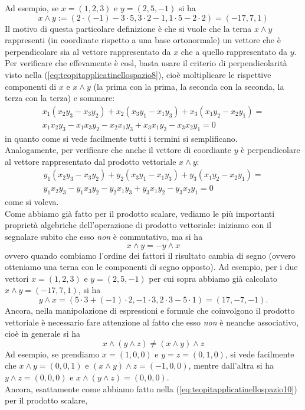 \documentclass{book}
\theoremstyle{definition}
\theoremstyle{plain}
\begin{document}
Ad esempio, se $x=(1,2,3)$ e $y=(2,5,-1)$ si ha
\begin{equation*}
  x\wedge y := (2\cdot (-1)-3\cdot 5, 3\cdot 2-1,1\cdot 5-2\cdot 2) = (-17,7,1)
\end{equation*}
Il motivo di questa particolare definizione è che si vuole che la terna $x \wedge y$ rappresenti (in coordinate rispetto a una base ortonormale) un vettore che è perpendicolare sia al vettore rappresentato da $x$ che a quello rappresentato da $y$.\\
Per verificare che effevamente è così, basta usare il criterio di perpendicolarità visto nella (\ref{eq:teopitapplicatinellospazio8}), cioè moltiplicare le rispettive componenti di $x$ e $x\wedge y$ (la prima con la prima, la seconda con la seconda, la terza con la terza) e sommare:
\begin{eqnarray*}
  x_1(x_2y_3-x_3y_2)+x_2(x_3y_1-x_1y_3)+x_3(x_1y_2-x_2y_1)=\\
  x_1x_2y_3-x_1x_3y_2-x_2x_1y_3+x_3x_1y_2-x_3x_2y_1=0
\end{eqnarray*}
in quanto come si vede facilmente tutti i termini si semplificano.\\
Analogamente, per verificare che anche il vettore di coordiante $y$ è perpendicolare al vettore rappresentato dal prodotto vettoriale $x\wedge y$:
\begin{eqnarray*}
  y_1(x_2y_3-x_3y_2)+y_2(x_3y_1-x_1y_3)+y_3(x_1y_2-x_2y_1)=\\
  y_1x_2y_3-y_1x_3y_2-y_2x_1y_3+y_3x_1y_2-y_3x_2y_1=0
\end{eqnarray*}
come si voleva.\\
Come abbiamo già fatto per il prodotto scalare, vediamo le più importanti proprietà algebriche dell'operazione di prodotto vettoriale: iniziamo con il segnalare subito che esso \textit{non} è commutativo, ma si ha
\begin{equation*}
  x\wedge y=-y\wedge x
\end{equation*}
ovvero quando combiamo l'ordine dei fattori il risultato cambia di segno (ovvero otteniamo una terna con le componenti di segno opposto). Ad esempio, per i due vettori $x=(1,2,3)$ e $y=(2,5,-1)$ per cui sopra abbiamo già calcolato $x\wedge y=(-17,7,1)$, si ha
\begin{equation*}
  y\wedge x=(5\cdot 3+(-1)\cdot 2, -1\cdot 3, 2\cdot 3-5\cdot 1)=(17, -7, -1).
\end{equation*}
Ancora, nella manipolazione di espressioni e formule che coinvolgono il prodotto vettoriale è necessario fare attenzione al fatto che esso \textit{non} è neanche associativo, cioè in generale si ha
\begin{equation*}
  x\wedge (y\wedge z)\neq (x\wedge y) \wedge z
\end{equation*}
Ad esempio, se prendiamo $x=(1,0,0)$ e $y=z=(0,1,0)$, si vede facilmente che $x\wedge y = (0,0,1)$ e $(x\wedge y) \wedge z=(-1,0,0)$, mentre dall'altra si ha $y\wedge z=(0,0,0)$ e $x\wedge (y\wedge z)=(0,0,0)$.\\
Ancora, esattamente come abbiamo fatto nella (\ref{eq:teopitapplicatinellospazio10}) per il prodotto scalare, 
\end{document}
